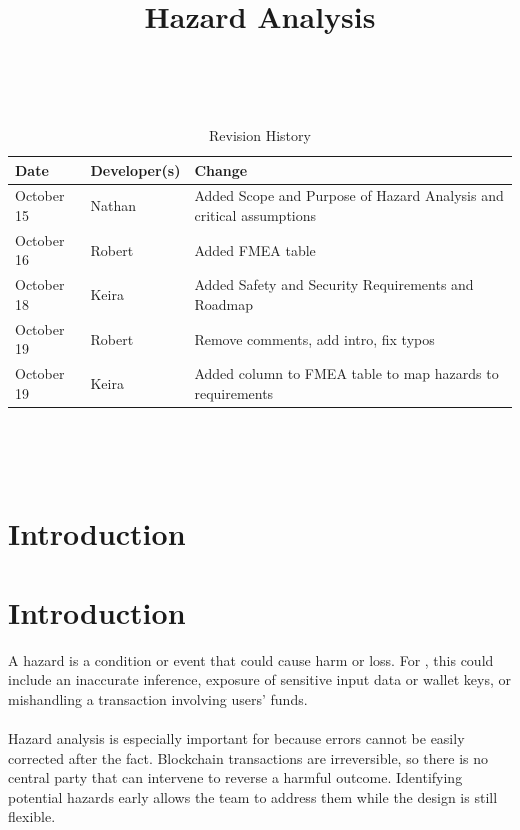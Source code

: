 \documentclass{article}
\title{Hazard Analysis\\\progname}
\author{\authname}
\date{}
\begin{document}
\maketitle
\thispagestyle{empty}

~\newpage


\begin{table}[hp]
\caption{Revision History} \label{TblRevisionHistory}
\begin{tabularx}{\textwidth}{llX}
\toprule
\textbf{Date} & \textbf{Developer(s)} & \textbf{Change}\\
\midrule
October 15 & Nathan & Added Scope and Purpose of Hazard Analysis and critical assumptions\\
October 16 & Robert & Added FMEA table\\
October 18 & Keira & Added Safety and Security Requirements and Roadmap\\
October 19 & Robert & Remove comments, add intro, fix typos \\
October 19 & Keira & Added column to FMEA table to map hazards to requirements\\
\bottomrule
\end{tabularx}
\end{table}

~\newpage

\tableofcontents

~\newpage



\section{Introduction}

\section{Introduction}

A hazard is a condition or event that could cause harm or loss. For
\progname{}, this could include an inaccurate inference, exposure of sensitive
input data or wallet keys, or mishandling a transaction involving users' funds.
\\\\
Hazard analysis is especially important for \progname{} because errors cannot be
easily corrected after the fact. Blockchain transactions are irreversible, so
there is no central party that can intervene to reverse a harmful outcome.
Identifying potential hazards early allows the team to address them while the design
is still flexible.
\end{document}
